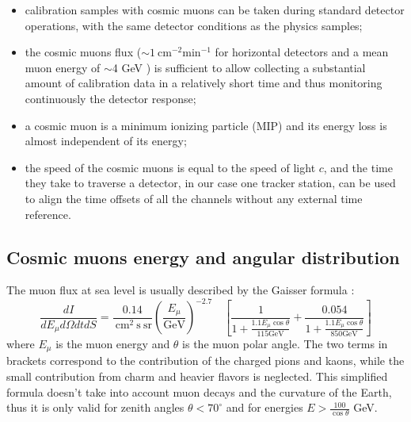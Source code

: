 \begin{itemize}
    \item calibration samples with cosmic muons 
    can be taken during standard detector operations, 
    with the same detector conditions as the physics samples;
    \item the cosmic muons flux 
    ($\sim 1 \ \text{cm}^{-2} \text{min}^{-1}$ 
    for horizontal detectors and a mean
    muon energy of $\sim$4 GeV \cite{muonflux}) 
    is sufficient to allow
    collecting a substantial amount of calibration 
    data in a relatively short time and 
    thus monitoring continuously the detector response;
    \item a cosmic muon is a minimum ionizing 
    particle (MIP) and 
    its energy loss is almost 
    independent of its energy;
    \item the speed of the cosmic muons is equal to the 
    speed of light $c$, and the time they take to traverse 
    a detector, in our case one tracker station, can be 
    used to align the time offsets of all the channels  
    without any external time reference.
\end{itemize}
\subsection{Cosmic muons energy and angular distribution}\label{distcos}
The muon flux at sea level is usually described by the Gaisser formula \cite{guan2015parametrization}:
\begin{equation}
    \frac{d I}{d E_\mu d \Omega d t d S}=\frac{0.14}{\mathrm{~cm}^2 \mathrm{~s} \ \mathrm{sr}}\left(\frac{E_\mu}{\mathrm{GeV}}\right)^{-2.7} \quad\left[\frac{1}{1+\frac{1.1 E_\mu \cos \theta}{115 \mathrm{GeV}}}+\frac{0.054}{1+\frac{1.1 E_\mu \cos \theta}{850 \mathrm{GeV}}}\right]
    \end{equation}
where $E_\mu$ is the muon energy and $\theta$ is the muon polar angle. 
The two terms in brackets correspond to the contribution of the charged pions and kaons, while 
the small contribution from charm and heavier flavors is neglected. 
This simplified formula doesn't take into account muon decays and the curvature of the Earth, 
thus it is only valid for zenith angles $\theta < 70^\circ$
and for energies $E > \frac{100}{\cos \theta}$ GeV.

